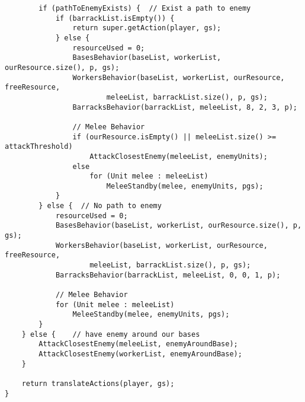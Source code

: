 \begin{verbatim}
        if (pathToEnemyExists) {  // Exist a path to enemy
            if (barrackList.isEmpty()) {
                return super.getAction(player, gs);
            } else {
                resourceUsed = 0;
                BasesBehavior(baseList, workerList, ourResource.size(), p, gs);
                WorkersBehavior(baseList, workerList, ourResource, freeResource,
                        meleeList, barrackList.size(), p, gs);
                BarracksBehavior(barrackList, meleeList, 8, 2, 3, p);

                // Melee Behavior
                if (ourResource.isEmpty() || meleeList.size() >= attackThreshold)
                    AttackClosestEnemy(meleeList, enemyUnits);
                else
                    for (Unit melee : meleeList)
                        MeleeStandby(melee, enemyUnits, pgs);
            }
        } else {  // No path to enemy
            resourceUsed = 0;
            BasesBehavior(baseList, workerList, ourResource.size(), p, gs);
            WorkersBehavior(baseList, workerList, ourResource, freeResource,
                    meleeList, barrackList.size(), p, gs);
            BarracksBehavior(barrackList, meleeList, 0, 0, 1, p);

            // Melee Behavior
            for (Unit melee : meleeList)
                MeleeStandby(melee, enemyUnits, pgs);
        }
    } else {    // have enemy around our bases
        AttackClosestEnemy(meleeList, enemyAroundBase);
        AttackClosestEnemy(workerList, enemyAroundBase);
    }

    return translateActions(player, gs);
}
\end{verbatim}

